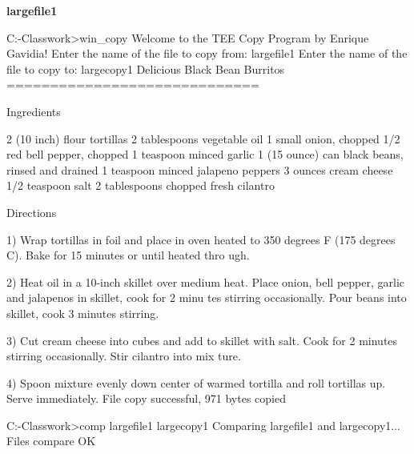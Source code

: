 \documentclass[12pt]{article}
\newcommand {\filename}[1] {\flushleft \textbf{#1}}
\begin{document}
\filename{largefile1}
\begin{shelloutput}
C:\Users\Enrique\School\OS-Classwork>win_copy
Welcome to the TEE Copy Program by Enrique Gavidia!
Enter the name of the file to copy from:
largefile1
Enter the name of the file to copy to:
largecopy1
Delicious Black Bean Burritos
=============================

Ingredients

2 (10 inch) flour tortillas
2 tablespoons vegetable oil
1 small onion, chopped
1/2 red bell pepper, chopped
1 teaspoon minced garlic
1 (15 ounce) can black beans, rinsed and drained
1 teaspoon minced jalapeno peppers
3 ounces cream cheese
1/2 teaspoon salt
2 tablespoons chopped fresh cilantro


Directions

1) Wrap tortillas in foil and place in oven heated to 350 degrees F (175 degrees C). Bake for 15 minutes or until heated thro
ugh.

2) Heat oil in a 10-inch skillet over medium heat. Place onion, bell pepper, garlic and jalapenos in skillet, cook for 2 minu
tes
stirring occasionally. Pour beans into skillet, cook 3 minutes stirring.

3) Cut cream cheese into cubes and add to skillet with salt. Cook for 2 minutes stirring occasionally. Stir cilantro into mix
ture.

4) Spoon mixture evenly down center of warmed tortilla and roll tortillas up. Serve immediately.
File copy successful, 971 bytes copied

C:\Users\Enrique\School\OS-Classwork>comp largefile1 largecopy1
Comparing largefile1 and largecopy1...
Files compare OK

\end{shelloutput}
\end{document}
